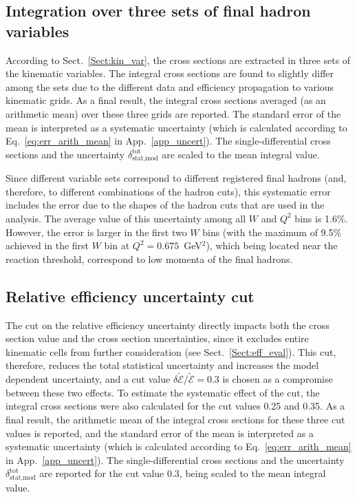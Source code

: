 \subsection{Integration over three sets of final hadron variables}

According to Sect.~\ref{Sect:kin_var}, the cross sections are extracted in three sets of the kinematic variables. The integral cross sections are found to slightly differ among the sets due to the different data and efficiency propagation to various kinematic grids. As a final result, the integral cross sections averaged (as an arithmetic mean) over these three grids are reported. The standard error of the mean is interpreted as a systematic uncertainty (which is calculated according to Eq.~\eqref{eq:err_arith_mean} in App.~\ref{app_uncert}). The single-differential cross sections and the uncertainty $\delta_{\text{stat,mod}}^{\text{tot}}$ are scaled to the mean integral value. 

Since different variable sets correspond to different registered final hadrons (and, therefore, to different combinations of the hadron cuts), this systematic error includes the error due to the shapes of the hadron cuts that are used in the analysis. The average value of this uncertainty among all $W$ and $Q^{2}$ bins is 1.6\%. However, the error is larger in the first two $W$ bins (with the maximum of 9.5\% achieved in the first $W$ bin at $Q^{2} = 0.675$~GeV$^{2}$), which being located near the reaction threshold, correspond to low momenta of the final hadrons.  

\subsection{Relative efficiency uncertainty cut}

The cut on the relative efficiency uncertainty directly impacts both the cross section value and the cross section uncertainties, since it excludes entire kinematic cells from further consideration (see Sect.~\ref{Sect:eff_eval}). This cut, therefore, reduces the total statistical uncertainty and increases the model dependent uncertainty, and a cut value $\delta \widetilde{\mathcal{E}}/\widetilde{\mathcal{E}} = 0.3$ is chosen as a compromise between these two effects. To estimate the systematic effect of the cut, the integral cross sections were also calculated for the cut values 0.25 and 0.35. As a final result, the arithmetic mean of the integral cross sections for these three cut values is reported, and the standard error of the mean is interpreted as a systematic uncertainty (which is calculated according to Eq.~\eqref{eq:err_arith_mean} in App.~\ref{app_uncert}). The single-differential cross sections and the uncertainty $\delta_{\text{stat,mod}}^{\text{tot}}$ are reported for the cut value 0.3, being scaled to the mean integral value.

